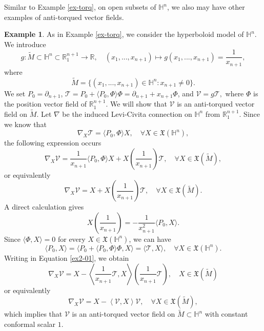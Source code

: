 \documentclass[12pt]{amsart}
\def\r{\mathbb R}
\def\h{\mathbb H}
\theoremstyle{definition}
\newtheorem{example}[theorem]{Example}
\begin{document}
Similar to Example \ref{ex-torq}, on open subsets of $\h^n$, we also may have other examples of anti-torqued vector fields.

\begin{example}\label{ex-antitorq}
As in Example \ref{ex-torq}, we consider the hyperboloid model of $\h^n$. We introduce 
\begin{equation*}
 g:\widetilde{M} \subset \h^n \subset \r_1^{n+1} \to \r, \quad (x_1,...,x_{n+1}) \mapsto g(x_1,...,x_{n+1})= \frac{1}{x_{n+1}},   
\end{equation*}
where
\begin{equation*}
 \widetilde{M}=\{(x_1,...,x_{n+1}) \in \h^n : x_{n+1}\neq 0 \}.   
\end{equation*}
We set $P_0=\partial_{n+1}$, 
$\mathcal{T}=P_0+\langle P_0 , \Phi \rangle \Phi=\partial_{n+1}+x_{n+1}\Phi$,  and $\mathcal{V}=g\mathcal{T},
$
where $\Phi$ is the position vector field of $\r_1^{n+1}$. We will show that $\mathcal{V}$ is an anti-torqued vector field on $\widetilde{M}$. Let $\nabla$ be the induced Levi-Civita connection on $\h^n$ from $\r_1^{n+1}$. Since we know that
\begin{equation*}
\nabla_X\mathcal{T}=\langle P_0 , \Phi \rangle X, \quad \forall X \in \mathfrak{X}(\h^n),    
\end{equation*}
the following expression occurs
\begin{equation*}
\nabla_X\mathcal{V}= \frac{1}{x_{n+1}}\langle P_0 , \Phi \rangle X +X\left( \frac{1}{x_{n+1}} \right )\mathcal{T}    , \quad \forall X \in \mathfrak{X}(\widetilde{M}), 
\end{equation*}
or equivalently
\begin{equation}
\nabla_X\mathcal{V}=  X +X\left( \frac{1}{x_{n+1}} \right )\mathcal{T}, \quad \forall X \in \mathfrak{X}(\widetilde{M}). \label{ex2-01}
\end{equation}
A direct calculation gives
\begin{equation*}
X\left( \frac{1}{x_{n+1}} \right )=- \frac{1}{x_{n+1}^2}\langle P_0, X\rangle.   
\end{equation*}
Since $\langle \Phi ,X \rangle =0$ for every $X\in \mathfrak{X}(\h^n)$, we can have 
\begin{equation*}
\langle P_0, X\rangle= \langle P_0 + \langle P_0 , \Phi \rangle \Phi , X \rangle =\langle  \mathcal{T},X \rangle, \quad \forall X \in \mathfrak{X}(\h^n). 
\end{equation*}
Writing in Equation \eqref{ex2-01}, we obtain
\begin{equation*}
\nabla_X\mathcal{V}=X-\left \langle \frac{1}{x_{n+1}} \mathcal{T}, X \right \rangle \left (\frac{1}{x_{n+1}}\mathcal{T} \right ), \quad X \in \mathfrak{X}(\widetilde{M})    
\end{equation*}
or equivalently
\begin{equation*}
\nabla_X\mathcal{V}=X-\left \langle \mathcal{V}, X \right \rangle \mathcal{V}, \quad \forall X \in \mathfrak{X}(\widetilde{M}),  
\end{equation*}
which implies that $\mathcal{V}$ is an anti-torqued vector field on $\widetilde{M} \subset \h^n$ with constant conformal scalar $1$.
\end{example}
\end{document}
